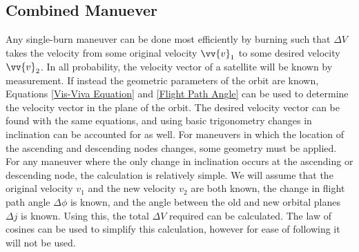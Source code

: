 \documentclass{article}
\begin{document}
\bigskip\bigskip
\subsection{Combined Manuever}

Any single-burn maneuver can be done most efficiently by burning such that $\Delta V$ takes the velocity from some original velocity $\vv{v}_1$ to some desired velocity $\vv{v}_2$. In all probability, the velocity vector of a satellite will be known by measurement. If instead the geometric parameters of the orbit are known, Equations \eqref{Vis-Viva Equation} and \eqref{Flight Path Angle} can be used to determine the velocity vector in the plane of the orbit. The desired velocity vector can be found with the same equations, and using basic trigonometry changes in inclination can be accounted for as well. For maneuvers in which the location of the ascending and descending nodes changes, some geometry must be applied. For any maneuver where the only change in inclination occurs at the ascending or descending node, the calculation is relatively simple. We will assume that the original velocity $v_1$ and the new velocity $v_2$ are both known, the change in flight path angle $\Delta \phi$ is known, and the angle between the old and new orbital planes $\Delta j$ is known. Using this, the total $\Delta V$ required can be calculated. The law of cosines can be used to simplify this calculation, however for ease of following it will not be used.
\end{document}
